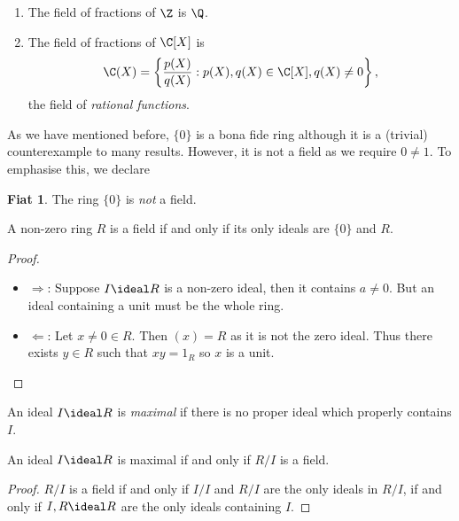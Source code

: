 \documentclass[a4paper]{article}
\theoremstyle{definition}
\newtheorem*{fiat}{Fiat}
\begin{document}
\begin{eg}\leavevmode
  \begin{enumerate}
  \item The field of fractions of \(\Z\) is \(\Q\).
  \item The field of fractions of \(\C[X]\) is
    \[
      \C(X) = \left\{ \frac{p(X)}{q(X)}: p(X), q(X) \in \C[X], q(X) \neq 0 \right\},
    \]
    the field of \emph{rational functions}.
  \end{enumerate}
\end{eg}

As we have mentioned before, \(\{0\}\) is a bona fide ring although it is a (trivial) counterexample to many results. However, it is not a field as we require \(0 \neq 1\). To emphasise this, we declare

\begin{fiat}
  The ring \(\{0\}\) is \emph{not} a field.
\end{fiat}

\begin{lemma}
  A non-zero ring \(R\) is a field if and only if its only ideals are \(\{0\}\) and \(R\).
\end{lemma}

\begin{proof}\leavevmode
  \begin{itemize}
  \item \(\Rightarrow\): Suppose \(I \ideal R\) is a non-zero ideal, then it contains \(a \neq 0\). But an ideal containing a unit must be the whole ring.
  \item \(\Leftarrow\): Let \(x \neq 0 \in R\). Then \((x) = R\) as it is not the zero ideal. Thus there exists \(y \in R\) such that \(xy = 1_R\) so \(x\) is a unit.
  \end{itemize}
\end{proof}

\begin{definition}
  An ideal \(I \ideal R\) is \emph{maximal} if there is no proper ideal which properly contains \(I\).
\end{definition}

\begin{lemma}
  An ideal \(I \ideal R\) is maximal if and only if \(R/I\) is a field.
\end{lemma}

\begin{proof}
  \(R/I\) is a field if and only if \(I/I\) and \(R/I\) are the only ideals in \(R/I\), if and only if \(I, R \ideal R\) are the only ideals containing \(I\).
\end{proof}
\end{document}
